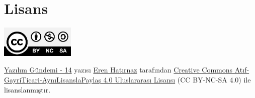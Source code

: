 \documentclass[11pt]{article}
\begin{document}
\section{Lisans}
\label{sec:orgef114c3}
\begin{center}
\begin{center}
\includegraphics[height=1.5cm]{../../../img/CC_BY-NC-SA_4.0.png}
\end{center}

\href{yazilim-gundemi-14.pdf}{Yazılım Gündemi - 14} yazısı \href{https://erenhatirnaz.github.io}{Eren Hatırnaz} tarafından \href{http://creativecommons.org/licenses/by-nc-sa/4.0/}{Creative Commons
Atıf-GayriTicari-AynıLisanslaPaylaş 4.0 Uluslararası Lisansı} (CC BY-NC-SA 4.0)
ile lisanslanmıştır.
\end{center}
\end{document}
